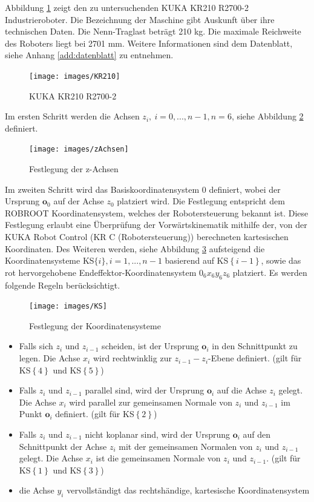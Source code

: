 Abbildung \ref{fig:kr210} zeigt den zu untersuchenden KUKA KR210 R2700-2 Industrieroboter. Die Bezeichnung der Maschine gibt Auskunft über ihre technischen Daten.  Die Nenn-Traglast beträgt 210 kg. Die maximale Reichweite des Roboters liegt bei 2701 mm. Weitere Informationen sind dem Datenblatt, siehe Anhang \ref{add:datenblatt} zu entnehmen.  
%
\begin{figure}[tbph]
	\centering
	\texttt{[image: images/KR210]}
	\caption{KUKA KR210 R2700-2}
	\label{fig:kr210}
\end{figure}
%
Im ersten Schritt werden die Achsen $z_i, \ i = 0,...,n-1, n=6$,	siehe Abbildung \ref{fig:zachsen} definiert. 
%
\begin{figure}[tbph]
	\centering
	\texttt{[image: images/zAchsen]}
	\caption[]{Festlegung der z-Achsen}
	\label{fig:zachsen}
\end{figure}
%
Im zweiten Schritt wird das Basiskoordinatensystem ${0}$ definiert, wobei der Ursprung $\bm{o}_0$ auf der Achse $z_0$ platziert wird. Die Festlegung entspricht dem ROBROOT Koordinatensystem, welches der Robotersteuerung bekannt ist. Diese Festlegung erlaubt eine Überprüfung der Vorwärtskinematik mithilfe der, von der KUKA Robot Control (KR C (Robotersteuerung)) berechneten kartesischen Koordinaten. Des Weiteren werden, siehe Abbildung \ref{fig:KS} aufsteigend die Koordinatensysteme KS$\{i\},i=1,...,n-1$ basierend auf KS$\left\{i-1\right\}$, sowie das rot hervorgehobene Endeffektor-Koordinatensystem $0_6x_6y_6z_6$ platziert. Es werden folgende Regeln berücksichtigt.  
%
\begin{figure}[tbph]
	\centering
	\texttt{[image: images/KS]}
	\caption{Festlegung der Koordinatensysteme}
	\label{fig:KS}
\end{figure}
%
\begin{itemize}
	\item Falls sich $z_i$ und $z_{i-1}$ scheiden, ist der Ursprung $\bm{o}_i$ in den Schnittpunkt zu legen. Die Achse $x_i$ wird rechtwinklig zur $z_{i-1}-z_i$-Ebene definiert. (gilt für KS$\left\{4\right\}$ und KS$\left\{5\right\}$)
	\item Falls  $z_i$ und $z_{i-1}$ parallel sind, wird der Ursprung $\bm{o}_i$ auf die Achse $z_i$ gelegt. Die Achse $x_i$ wird parallel zur gemeinsamen Normale von $z_i$ und $z_{i-1}$	im Punkt $\bm{o}_i$ definiert. (gilt für KS$\left\{2\right\}$)
	\item Falls  $z_i$ und $z_{i-1}$ nicht koplanar sind, wird der Ursprung $\bm{o}_i$ auf den Schnittpunkt der Achse $z_i$ mit der gemeinsamen Normalen von $z_i$ und $z_{i-1}$  gelegt. Die Achse $x_i$ ist die gemeinsamen Normale von $z_i$ und $z_{i-1}$. (gilt für KS$\left\{1\right\}$ und KS$\left\{3\right\}$)
	\item die Achse $y_i$ vervollständigt das rechtshändige, kartesische Koordinatensystem
\end{itemize} 
